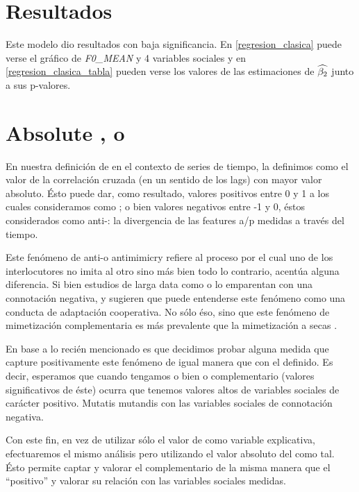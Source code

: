 \section{Resultados}

Este modelo dio resultados con baja significancia. En \ref{regresion_clasica} puede verse el gráfico de \emph{F0\_MEAN} y 4 variables sociales y en \ref{regresion_clasica_tabla} pueden verse los valores de las estimaciones de $\widehat{\beta_2}$ junto a sus p-valores.



\section{Absolute \entrainment, o \disentrainment}

En nuestra definición de \entrainment en el contexto de series de tiempo, la definimos como el valor de la correlación cruzada (en un sentido de los lags) con mayor valor absoluto. Ésto puede dar, como resultado, valores positivos entre 0 y 1 a los cuales consideramos como \entrainment; o bien valores negativos entre -1 y 0, éstos considerados como anti-\entrainment: la divergencia de las features a/p medidas a través del tiempo.

Este fenómeno de anti-\entrainment o antimimicry \cite{CHAR1999} refiere al proceso por el cual uno de los interlocutores no imita al otro sino más bien todo lo contrario, acentúa alguna diferencia. Si bien estudios de larga data como \cite{bourhis1973language} o \cite{dabbs1969similarity} lo emparentan con una connotación negativa, \cite{healey2014divergence} y \cite{levitan2015acoustic} sugieren que puede entenderse este fenómeno como una conducta de adaptación cooperativa. No sólo éso, sino que este fenómeno de mimetización complementaria es más prevalente que la mimetización a secas \cite{levitan2015acoustic}.

En base a lo recién mencionado es que decidimos probar alguna medida que capture positivamente este fenómeno de igual manera que con el \entrainment definido. Es decir, esperamos que cuando tengamos o bien \entrainment o \entrainment complementario (valores significativos de éste) ocurra que tenemos valores altos de variables sociales de carácter positivo. Mutatis mutandis con las variables sociales de connotación negativa.

Con este fin, en vez de utilizar sólo el valor de \entrainment como variable explicativa, efectuaremos el mismo análisis pero utilizando el valor absoluto del \entrainment como tal. Ésto permite captar y valorar el \entrainment complementario de la misma manera que el ``positivo'' y valorar su relación con las variables sociales medidas.
